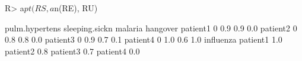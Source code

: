 \begin{Schunk}
% --begin: "comp.circ.excl.unavoid"
\begin{Sinput}
R> a$pt(RS, a$n(RE), RU)
\end{Sinput}
\begin{Soutput}
         pulm.hypertens sleeping.sickn malaria hangover
patient1              0            0.9     0.9      0.0
patient2              0            0.8     0.8      0.0
patient3              0            0.9     0.7      0.1
patient4              0            1.0     0.6      1.0
         influenza
patient1       1.0
patient2       0.8
patient3       0.7
patient4       0.0
\end{Soutput}
%
% --end: "comp.circ.excl.unavoid"
\end{Schunk}
